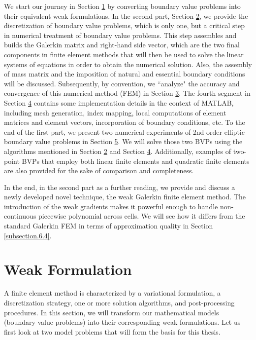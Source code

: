 	We start our journey in Section \hyperref[section.1]{1} by converting 
	boundary value problems into their equivalent weak formulations. 
	In the second part, Section \hyperref[section.2]{2},
	we provide the discretization of boundary value problems, which
	is only one, but a critical step in numerical treatment of boundary
	value problems. This step assembles and builds the Galerkin matrix and
	right-hand side vector, which are the two final components in finite
	element methods that will then be used to solve the linear systems of
	equations in order to obtain the numerical solution.
	Also, the assembly of mass matrix and the imposition of natural and 
	essential boundary conditions will be discussed.	
	Subsequently, by convention, we ``analyze" the accuracy and convergence 
	of this numerical method (FEM) in Section \hyperref[section.3]{3}.	
	The fourth segment in Section \hyperref[section.4]{4} contains some
	implementation details in the context of MATLAB, including mesh generation, 
	index mapping, local computations of element matrices and element vectors,
	incorporation of boundary conditions, etc. To the end of the first part,
	we present two numerical experiments of 2nd-order elliptic boundary value 
	problems in Section \hyperref[section.5]{5}. We will solve those two BVPs 
	using the algorithms mentioned in Section \hyperref[section.2]{2} and 
	Section \hyperref[section.4]{4}. Additionally, examples of 
	two-point BVPs that	employ both linear finite elements and quadratic 
	finite elements are	also provided for the sake of comparison and 
	completeness.
	
	In the end, in the second part as a further reading, we	provide and discuss 
	a newly developed novel technique, the weak Galerkin finite element	method.
	The introduction of the weak gradients makes it powerful enough to handle 
	non-continuous piecewise polynomial across cells. We will see how it 
	differs from the standard Galerkin FEM in terms of approximation quality in 
	Section \ref{subsection.6.4}.
	
	\clearpage
	\section{Weak Formulation}\label{section.1}
	A finite element method is characterized by a variational formulation,
	a discretization strategy, one or more solution algorithms, 
	and post-processing procedures. In this section, we will transform our 
	mathematical models (boundary value problems) into their corresponding  
	weak formulations. Let us first look at two model problems that
	will form the basis for this thesis.
	
